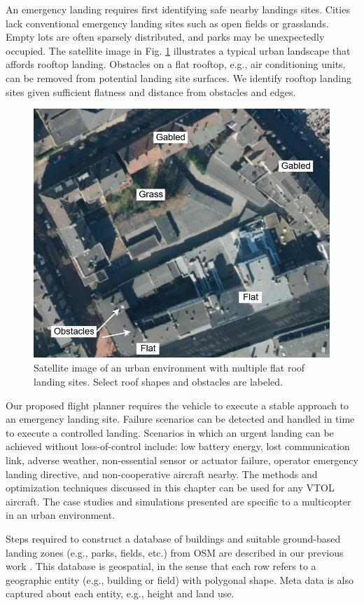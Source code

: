 An emergency landing requires first identifying safe nearby landings sites.  Cities lack conventional emergency landing sites such as open fields or grasslands. Empty lots are often sparsely distributed, and parks may be unexpectedly occupied.  The satellite image in Fig. \ref{fig:ch5_challenge_urban} illustrates a typical urban landscape that affords rooftop landing. Obstacles on a flat rooftop, e.g., air conditioning units, can be removed from potential landing site surfaces. We identify rooftop landing sites given sufficient flatness and distance from obstacles and edges. 

\begin{figure}[ht]
    \centering
    \includegraphics[clip, trim=0.0cm 0cm 0cm 0cm, width=0.45\linewidth]{chapter_5_mapping/imgs/challenge_urban-Page-2.jpg}
    \caption[Satellite image of an urban environment with multiple flat roof landing sites]{Satellite image of an urban environment with multiple flat roof landing sites. Select roof shapes and obstacles are labeled.}
    \label{fig:ch5_challenge_urban}
\end{figure}

Our proposed flight planner requires the vehicle to execute a stable approach to an emergency landing site.  Failure scenarios can be detected and handled in time to execute a controlled landing. Scenarios in which an urgent landing can be achieved without loss-of-control include: low battery energy, lost communication link, adverse weather, non-essential sensor or actuator failure, operator emergency landing directive, and non-cooperative aircraft nearby.  The methods and optimization techniques discussed in this chapter can be used for any VTOL aircraft. The case studies and simulations presented are specific to a multicopter in an urban environment.

Steps required to construct a database of buildings and suitable ground-based landing zones (e.g., parks, fields, etc.) from  \ac{OSM} are described in our previous work \cite{castagno_comprehensive_2018}.  This database is geospatial, in the sense that each row refers to a geographic entity (e.g., building or field) with polygonal shape. Meta data is also captured about each entity, e.g., height and land use. 

